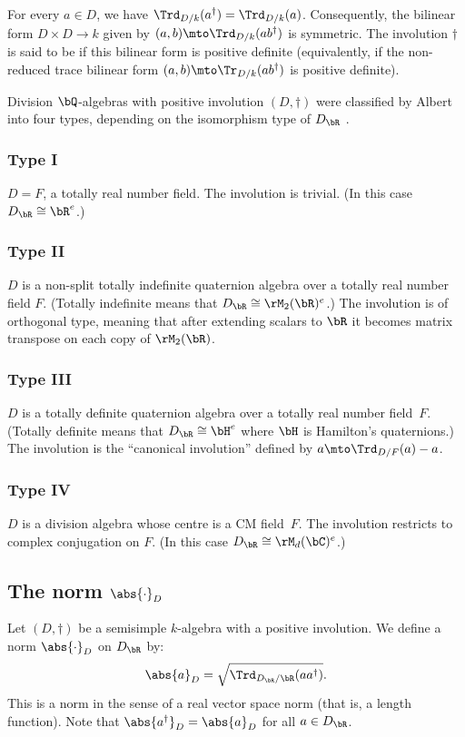 For every $a \in D$, we have $\Trd_{D/k}(a^\dag) = \Trd_{D/k}(a)$.
Consequently, the bilinear form $D \times D \to k$ given by $(a,b) \mto \Trd_{D/k}(ab^\dag)$ is symmetric. The involution $\dag$ is said to be  if this bilinear form is positive definite (equivalently, if the non-reduced trace bilinear form $(a,b) \mto \Tr_{D/k}(ab^\dag)$ is positive definite).

Division $\bQ$-algebras with positive involution $(D,\dag)$ were classified by Albert into four types, depending on the isomorphism type of $D_\bR$ \cite[\S21, Th.\,2]{Mum74}.

\subsubsection*{Type I} $D = F$, a totally real number field. The involution is trivial. (In this case $D_\bR \cong \bR^e$.)
\subsubsection*{Type II} $D$ is a non-split totally indefinite quaternion algebra over a totally real number field $F$. (Totally indefinite means that $D_\bR \cong \rM_2(\bR)^e$.)
The involution is of orthogonal type, meaning that after extending scalars to $\bR$ it becomes matrix transpose on each copy of $\rM_2(\bR)$.
\subsubsection*{Type III} $D$ is a totally definite quaternion algebra over a totally real number field~$F$. (Totally definite means that $D_\bR \cong \bH^e$ where $\bH$ is Hamilton's quaternions.)
The involution is the ``canonical involution'' defined by $a \mto \Trd_{D/F}(a) - a$.
\subsubsection*{Type IV} $D$ is a division algebra whose centre is a CM field~$F$.
The involution restricts to complex conjugation on $F$. (In this case $D_\bR \cong \rM_d(\bC)^e$.)

\subsection{The norm \texorpdfstring{$\abs{\cdot}_D$}{||D}} \label{subsec:norm-D}

Let $(D,\dag)$ be a semisimple $k$-algebra with a positive involution.
We define a norm $\abs{\cdot}_D$ on $D_\bR$ by:
\[
\abs{a}_D = \sqrt{\Trd_{D_\bR/\bR}(aa^\dag)}.
\]
This is a norm in the sense of a real vector space norm (that is, a length function).
Note that $\abs{a^\dag}_D = \abs{a}_D$ for all $a \in D_\bR$.


